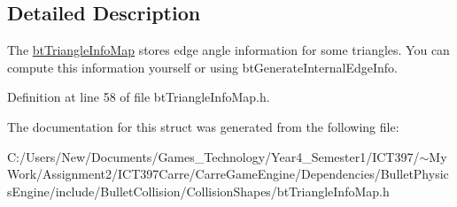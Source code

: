 \subsection{Detailed Description}
The \hyperlink{structbt_triangle_info_map}{btTriangleInfoMap} stores edge angle information for some triangles. You can compute this information yourself or using btGenerateInternalEdgeInfo. 

Definition at line 58 of file btTriangleInfoMap.h.

The documentation for this struct was generated from the following file:\begin{CompactItemize}
\item 
C:/Users/New/Documents/Games\_\-Technology/Year4\_\-Semester1/ICT397/$\sim$My Work/Assignment2/ICT397Carre/CarreGameEngine/Dependencies/BulletPhysicsEngine/include/BulletCollision/CollisionShapes/btTriangleInfoMap.h\end{CompactItemize}
